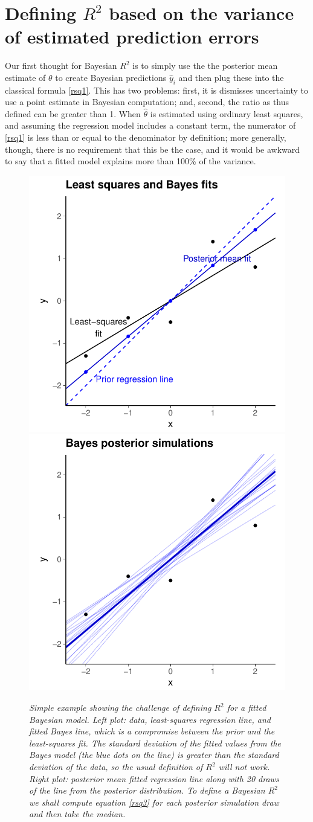 \documentclass[11pt]{article}
\begin{document}
\section{Defining $R^2$ based on the variance of estimated prediction errors}

Our first thought for Bayesian $R^2$ is to simply use the the posterior mean
estimate of $\theta$ to create Bayesian predictions $\hat{y}_i$ and then plug
these into the classical formula \eqref{rsq1}.  This has two problems:  first,
it is dismisses uncertainty to use a point estimate in Bayesian computation;
and, second, the ratio as thus defined can be greater than 1.  When
$\hat{\theta}$ is estimated using ordinary least squares, and assuming the
regression model includes a constant term, the numerator of \eqref{rsq1} is less
than or equal to the denominator by definition; more generally, though, there is
no requirement that this be the case, and it would be awkward to say that a
fitted model explains more than 100\% of the variance.

\begin{figure}
\centerline{\includegraphics[width=.5\textwidth]{fig/fig_1a.pdf}\includegraphics[width=.5\textwidth]{fig/fig_1b.pdf}}
\vspace{-.1in}
\caption{\em Simple example showing the challenge of defining $R^2$ for a fitted
Bayesian model.  {\em Left plot:}  data, least-squares regression line, and
fitted Bayes line, which is a compromise between the prior and the least-squares
fit.  The standard deviation of the fitted values from the Bayes model (the blue
dots on the line) is greater than the standard deviation of the data, so the
usual definition of $R^2$ will not work.  {\em Right plot:}  posterior mean
fitted regression line along with 20 draws of the line from the posterior
distribution.  To define a Bayesian $R^2$ we shall compute equation 
\eqref{rsq3} for each posterior simulation draw and then take the median.}
\label{rsquared1}
\end{figure}
\end{document}
